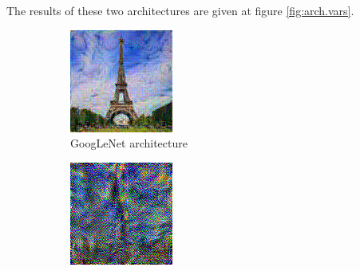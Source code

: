 \documentclass[twocolumn,superscriptaddress,aps,floatfix, nofootinbib]{revtex4-1}
\begin{document}
    The results of these two architectures are given at figure \ref{fig:arch.vars}.
    
    \begin{figure}[ht]
        \centering
        \begin{subfigure}[b]{0.22\textwidth}
            \centering
            \includegraphics[width=\textwidth]{resources/png/model/googlenet.png}
            \caption{GoogLeNet architecture}
        \end{subfigure}
        \hfill
        \begin{subfigure}[b]{0.22\textwidth}
            \centering
            \includegraphics[width=\textwidth]{resources/png/model/alexnet.png}

\end{subfigure}
\end{figure}
\end{document}
